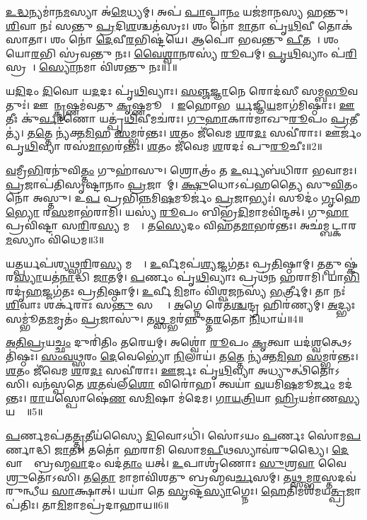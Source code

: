 \ul{𑌉}\ul{𑌦𑍍𑌧}𑌨𑍍𑌯𑌮𑌾॑𑌨\ul{𑌮}𑌸𑍍𑌯𑌾 𑌅॑\ul{𑌮𑍇}𑌧𑍍𑌯𑌮𑍍।
𑌅𑌪॑ \ul{𑌪𑌾}𑌪𑍍𑌮𑌾\ul{𑌨𑌂} 𑌯𑌜॑𑌮𑌾𑌨𑌸𑍍𑌯 𑌹𑌨𑍍𑌤𑍁।
\ul{𑌶𑌿}𑌵𑌾 𑌨𑌃॑ 𑌸𑌨𑍍𑌤𑍁 \ul{𑌪𑍍𑌰}𑌦𑌿\ul{𑌶}𑌶𑍍𑌚𑌤॑𑌸𑍍𑌰𑌃।
𑌶𑌂 𑌨𑍋॑ \ul{𑌮𑌾}𑌤𑌾 𑌪𑍃॑\ul{𑌥𑌿}𑌵𑍀 𑌤𑍋𑌕॑𑌸𑌾𑌤𑌾।
𑌶𑌂 𑌨𑍋॑ \ul{𑌦𑍇}𑌵𑍀\ul{𑌰}𑌭𑌿𑌷𑍍𑌟॑𑌯𑍇।
𑌆𑌪𑍋॑ 𑌭𑌵𑌨𑍍𑌤𑍁 \ul{𑌪𑍀}𑌤𑌯𑍇᳚।
𑌶𑌂 𑌯𑍋\ul{𑌰}𑌭𑌿 𑌸𑍍𑌰॑𑌵𑌨𑍍𑌤𑍁 𑌨𑌃।
\ul{𑌵𑍈}\ul{𑌶𑍍𑌵𑌾}\ul{𑌨}𑌰𑌸𑍍𑌯॑ \ul{𑌰𑍂}𑌪𑌮𑍍।
\ul{𑌪𑍃}\ul{𑌥𑌿}𑌵𑍍𑌯𑌾𑌂 𑌪॑\ul{𑌰𑌿}𑌸𑍍𑌰𑌸𑌾᳚।
\ul{𑌸𑍍𑌯𑍋}𑌨𑌮𑌾 𑌵𑌿॑𑌶𑌨𑍍𑌤𑍁 𑌨𑌃॥1॥

𑌯\ul{𑌦𑌿}𑌦𑌂 \ul{𑌦𑌿}𑌵𑍋 𑌯\ul{𑌦}𑌦𑌃 𑌪𑍃॑\ul{𑌥𑌿}𑌵𑍍𑌯𑌾𑌃।
\ul{𑌸}\ul{𑌞𑍍𑌜}\ul{𑌜𑍍𑌞𑌾}𑌨𑍇 𑌰𑍋𑌦॑𑌸𑍀 𑌸𑌮𑍍𑌬\ul{𑌭𑍂}𑌵𑌤𑍁𑌃॑।
𑌊𑌷𑌾᳚\ul{𑌨𑍍𑌕𑍃}𑌷𑍍𑌣𑌮॑𑌵𑌤𑍁 \ul{𑌕𑍃}𑌷𑍍𑌣𑌮𑍂𑌷𑌾𑌃᳚।
\ul{𑌇}𑌹𑍋𑌭𑌯𑍋᳚\ul{𑌰𑍍𑌯}𑌜𑍍𑌞𑌿\ul{𑌯}\-𑌮𑌾𑌗॑𑌮𑌿𑌷𑍍𑌠𑌾𑌃।
\ul{𑌊}𑌤𑍀𑌃 𑌕𑍁॑\ul{𑌰𑍍𑌵𑌾}𑌣𑍋 𑌯𑌤𑍍𑌪𑍃॑\ul{𑌥𑌿}𑌵𑍀𑌮𑌚॑𑌰𑌃।
\ul{𑌗𑍁}\ul{𑌹𑌾}𑌕𑌾𑌰॑𑌮𑌾𑌖𑍁\ul{𑌰𑍂}𑌪𑌂 \ul{𑌪𑍍𑌰}𑌤𑍀𑌤𑍍𑌯॑।
𑌤\ul{𑌤𑍍𑌤𑍇} 𑌨𑍍𑌯॑𑌕𑍍𑌤\ul{𑌮𑌿}𑌹 \ul{𑌸}𑌮𑍍𑌭𑌰॑𑌨𑍍𑌤𑌃।
\ul{𑌶}𑌤𑌂 𑌜𑍀॑𑌵𑍇𑌮 \ul{𑌶}𑌰\ul{𑌦𑌃} 𑌸𑌵𑍀॑𑌰𑌾𑌃।
𑌊𑌰𑍍𑌜𑌂॑ 𑌪𑍃\ul{𑌥𑌿}𑌵𑍍𑌯𑌾 𑌰𑌸॑\ul{𑌮𑌾}𑌭𑌰॑𑌨𑍍𑌤𑌃।
\ul{𑌶}𑌤𑌂 𑌜𑍀॑𑌵𑍇𑌮 \ul{𑌶}𑌰𑌦𑌃॑ 𑌪𑍁\ul{𑌰𑍂}𑌚𑍀𑌃॥2॥

\ul{𑌵}𑌮𑍍𑌰𑍀\ul{𑌭𑌿}𑌰𑌨𑍁॑𑌵𑌿\ul{𑌤𑍍𑌤𑌂} 𑌗𑍁𑌹𑌾॑𑌸𑍁।
𑌶𑍍𑌰𑍋𑌤𑍍𑌰𑌂॑ 𑌤 \ul{𑌉}𑌰𑍍𑌵𑍍𑌯𑌬॑𑌧𑌿𑌰𑌾 𑌭𑌵𑌾𑌮𑌃।
\ul{𑌪𑍍𑌰}𑌜𑌾𑌪॑𑌤𑌿𑌸𑍃𑌷𑍍𑌟𑌾𑌨𑌾𑌂 \ul{𑌪𑍍𑌰}𑌜𑌾𑌨𑌾᳚𑌮𑍍।
\ul{𑌕𑍍𑌷𑍁}𑌧𑍋\-𑌽𑌪॑𑌹𑌤𑍍𑌯𑍈 𑌸𑍁\ul{𑌵𑌿}𑌤𑌂 𑌨𑍋॑ 𑌅𑌸𑍍𑌤𑍁।
𑌉\ul{𑌪} 𑌪𑍍𑌰𑌭𑌿॑\ul{𑌨𑍍𑌨}𑌮𑌿\ul{𑌷}𑌮𑍂𑌰𑍍𑌜𑌂॑ \ul{𑌪𑍍𑌰}𑌜𑌾𑌭𑍍𑌯𑌃॑।
𑌸𑍂𑌦𑌂॑ \ul{𑌗𑍃}𑌹𑍇\ul{𑌭𑍍𑌯𑍋} 𑌰\ul{𑌸}𑌮𑌾𑌭॑𑌰𑌾𑌮𑌿।
𑌯𑌸𑍍𑌯॑ \ul{𑌰𑍂}𑌪𑌂 𑌬𑌿𑌭𑍍𑌰॑\ul{𑌦𑌿}𑌮𑌾𑌮𑌵𑌿॑𑌨𑍍𑌦𑌤𑍍।
𑌗𑍁\ul{𑌹𑌾} 𑌪𑍍𑌰𑌵𑌿॑𑌷𑍍𑌟𑌾 𑌸\ul{𑌰𑌿}𑌰\ul{𑌸𑍍𑌯} 𑌮𑌧𑍍𑌯𑍇᳚।
𑌤\ul{𑌸𑍍𑌯𑍇}𑌦𑌂 𑌵𑌿𑌹॑𑌤\ul{𑌮𑌾}𑌭𑌰॑𑌨𑍍𑌤𑌃।
𑌅𑌛॑𑌮𑍍𑌬𑌟𑍍𑌕𑌾𑌰\ul{𑌮}𑌸𑍍𑌯𑌾𑌂 𑌵𑌿॑𑌧𑍇𑌮॥3॥

𑌯\ul{𑌤𑍍𑌪}𑌰𑍍𑌯𑌪॑𑌶𑍍𑌯𑌥𑍍𑌸\ul{𑌰𑌿}𑌰\ul{𑌸𑍍𑌯} 𑌮𑌧𑍍𑌯𑍇᳚।
\ul{𑌉}𑌰𑍍𑌵𑍀𑌮𑌪॑\ul{𑌶𑍍𑌯}𑌜𑍍𑌜𑌗॑𑌤𑌃 𑌪𑍍𑌰\ul{𑌤𑌿}𑌷𑍍𑌠𑌾𑌮𑍍।
𑌤𑌤𑍍𑌪𑍁𑌷𑍍𑌕॑𑌰\ul{𑌸𑍍𑌯𑌾}𑌯𑌤॑\ul{𑌨𑌾}𑌦𑍍𑌧𑌿 \ul{𑌜𑌾}𑌤𑌮𑍍।
\ul{𑌪}𑌰𑍍𑌣𑌂 𑌪𑍃॑\ul{𑌥𑌿}𑌵𑍍𑌯𑌾𑌃 𑌪𑍍𑌰𑌥॑𑌨 𑌹𑌰𑌾𑌮𑌿।
𑌯𑌾\ul{𑌭𑌿}𑌰𑌦𑍃॑\ul{𑌹}𑌜𑍍𑌜𑌗॑𑌤𑌃 𑌪𑍍𑌰\ul{𑌤𑌿}𑌷𑍍𑌠𑌾𑌮𑍍।
\ul{𑌉}𑌰𑍍𑌵𑍀\ul{𑌮𑌿}𑌮𑌾𑌂 𑌵𑌿॑𑌶𑍍𑌵\ul{𑌜}𑌨𑌸𑍍𑌯॑ \ul{𑌭}𑌰𑍍𑌤𑍍𑌰𑍀𑌮𑍍।
𑌤𑌾 𑌨𑌃॑ \ul{𑌶𑌿}𑌵𑌾𑌃 𑌶𑌰𑍍𑌕॑𑌰𑌾𑌃 𑌸\ul{𑌨𑍍𑌤𑍁} 𑌸𑌰𑍍𑌵𑌾𑌃᳚।
\ul{𑌅}𑌗𑍍𑌨𑍇 𑌰𑍇𑌤॑\ul{𑌶𑍍𑌚}𑌨𑍍𑌦𑍍𑌰 𑌹𑌿𑌰॑𑌣𑍍𑌯𑌮𑍍।
\ul{𑌅}𑌦𑍍𑌭𑍍𑌯𑌃 𑌸𑌮𑍍𑌭𑍂॑𑌤\ul{𑌮}𑌮𑍃𑌤𑌂॑ \ul{𑌪𑍍𑌰}𑌜𑌾𑌸𑍁॑।
𑌤\ul{𑌥𑍍𑌸}𑌮𑍍𑌭𑌰॑𑌨𑍍𑌨𑍁𑌤𑍍𑌤\ul{𑌰}𑌤𑍋 \ul{𑌨𑌿}𑌧𑌾𑌯॑॥4॥

\ul{𑌅}\ul{𑌤𑌿}\ul{𑌪𑍍𑌰}𑌯\ul{𑌚𑍍𑌛𑌂} 𑌦𑍁𑌰𑌿॑𑌤𑌿𑌂 𑌤𑌰𑍇𑌯𑌮𑍍।
𑌅𑌶𑍍𑌵𑍋॑ \ul{𑌰𑍂}𑌪𑌂 \ul{𑌕𑍃}𑌤𑍍𑌵𑌾 𑌯𑌦॑\ul{𑌶𑍍𑌵}𑌤𑍍𑌥𑍇\-𑌽𑌤𑌿॑𑌷𑍍𑌠𑌃।
\ul{𑌸𑌂}\ul{𑌵}\ul{𑌥𑍍𑌸}𑌰𑌂 \ul{𑌦𑍇}𑌵𑍇𑌭𑍍𑌯𑍋॑ \ul{𑌨𑌿}𑌲𑌾𑌯॑।
𑌤\ul{𑌤𑍍𑌤𑍇} 𑌨𑍍𑌯॑𑌕𑍍𑌤\ul{𑌮𑌿}𑌹 \ul{𑌸}𑌮𑍍𑌭𑌰॑𑌨𑍍𑌤𑌃।
\ul{𑌶}𑌤𑌂 𑌜𑍀॑𑌵𑍇𑌮 \ul{𑌶}𑌰\ul{𑌦𑌃} 𑌸𑌵𑍀॑𑌰𑌾𑌃।
\ul{𑌊}𑌰𑍍𑌜𑌃 𑌪𑍃॑\ul{𑌥𑌿}𑌵𑍍𑌯𑌾 𑌅𑌧𑍍𑌯𑍁𑌤𑍍𑌥𑌿॑𑌤𑍋𑌽𑌸𑌿।
𑌵𑌨॑𑌸𑍍𑌪𑌤𑍇 \ul{𑌶}𑌤𑌵॑𑌲𑍍‌\ul{𑌶𑍋} 𑌵𑌿𑌰𑍋॑𑌹।
𑌤𑍍𑌵𑌯𑌾॑ \ul{𑌵}𑌯𑌮𑌿\ul{𑌷}𑌮𑍂\ul{𑌰𑍍𑌜𑌂} 𑌮𑌦॑𑌨𑍍𑌤𑌃।
\ul{𑌰𑌾}𑌯𑌸𑍍𑌪𑍋𑌷𑍇॑\ul{𑌣} 𑌸\ul{𑌮𑌿}𑌷𑌾 𑌮॑𑌦𑍇𑌮।
\ul{𑌗𑌾}\ul{𑌯}\ul{𑌤𑍍𑌰𑌿}𑌯𑌾 \ul{𑌹𑍍𑌰𑌿}𑌯𑌮𑌾॑𑌣\ul{𑌸𑍍𑌯} 𑌯𑌤𑍍𑌤𑍇᳚॥5॥

\ul{𑌪}𑌰𑍍𑌣𑌮𑌪॑𑌤\ul{𑌤𑍍𑌤𑍃}𑌤𑍀𑌯॑𑌸𑍍𑌯𑍈 \ul{𑌦𑌿}𑌵𑍋𑌽𑌧𑌿॑।
𑌸𑍋॑𑌽𑌯𑌂 \ul{𑌪}𑌰𑍍𑌣𑌃 𑌸𑍋॑𑌮\ul{𑌪}𑌰𑍍𑌣𑌾𑌦𑍍𑌧𑌿 \ul{𑌜𑌾}𑌤𑌃।
𑌤𑌤𑍋॑ 𑌹𑌰𑌾𑌮𑌿 𑌸𑍋𑌮\ul{𑌪𑍀}𑌥𑌸𑍍𑌯𑌾𑌵॑𑌰𑍁𑌦𑍍𑌧𑍍𑌯𑍈।
\ul{𑌦𑍇}𑌵𑌾𑌨𑌾𑌂᳚ 𑌬𑍍𑌰𑌹𑍍𑌮\ul{𑌵𑌾}𑌦𑌂 𑌵𑌦॑\ul{𑌤𑌾𑌂} 𑌯𑌤𑍍।
\ul{𑌉}𑌪𑌾𑌶𑍃॑𑌣𑍋𑌃 \ul{𑌸𑍁}𑌶𑍍𑌰\ul{𑌵𑌾} 𑌵𑍈 \ul{𑌶𑍍𑌰𑍁}𑌤𑍋॑𑌽𑌸𑌿।
𑌤\ul{𑌤𑍋} 𑌮𑌾𑌮𑌾𑌵𑌿॑𑌶𑌤𑍁 𑌬𑍍𑌰𑌹𑍍𑌮𑌵\ul{𑌰𑍍𑌚}𑌸𑌮𑍍।
𑌤\ul{𑌥𑍍𑌸}𑌮𑍍𑌭\ul{𑌰}\ul{}𑌸𑍍𑌤𑌦𑌵॑𑌰𑍁𑌨𑍍𑌧𑍀𑌯 \ul{𑌸𑌾}𑌕𑍍𑌷𑌾𑌤𑍍।
𑌯𑌯𑌾॑ 𑌤𑍇 \ul{𑌸𑍃}𑌷𑍍𑌟\ul{𑌸𑍍𑌯𑌾}𑌗𑍍𑌨𑍇𑌃।
\ul{𑌹𑍇}𑌤𑌿𑌮𑌶॑𑌮𑌯\ul{𑌤𑍍𑌪𑍍𑌰}𑌜𑌾𑌪॑𑌤𑌿𑌃।
𑌤𑌾\ul{𑌮𑌿}𑌮𑌾𑌮𑌪𑍍𑌰॑𑌦𑌾𑌹𑌾𑌯॥6॥

